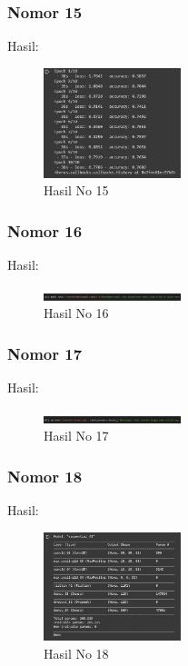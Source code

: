 \subsubsection{Nomor 15}
\hfill\break

Hasil:
\begin{figure}[H]
\centering
	\includegraphics[width=4cm]{figures/1174053/7/no15.jpg}
	\caption{Hasil No 15}
\end{figure}

\subsubsection{Nomor 16}
\hfill\break

Hasil:
\begin{figure}[H]
\centering
	\includegraphics[width=4cm]{figures/1174053/7/no16.jpg}
	\caption{Hasil No 16}
\end{figure}

\subsubsection{Nomor 17}
\hfill\break

Hasil:
\begin{figure}[H]
\centering
	\includegraphics[width=4cm]{figures/1174053/7/no17.jpg}
	\caption{Hasil No 17}
\end{figure}

\subsubsection{Nomor 18}
\hfill\break

Hasil:
\begin{figure}[H]
\centering
	\includegraphics[width=4cm]{figures/1174053/7/no18.jpg}
	\caption{Hasil No 18}
\end{figure}

